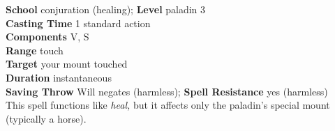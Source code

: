 \textbf{School} conjuration (healing); \textbf{Level} paladin 3\\
\textbf{Casting Time} 1 standard action\\
\textbf{Components} V, S\\
\textbf{Range} touch\\
\textbf{Target} your mount touched\\
\textbf{Duration} instantaneous\\
\textbf{Saving Throw }Will negates (harmless); \textbf{Spell Resistance} yes (harmless)\\
This spell functions like \textit{heal, }but it affects only the paladin's special mount (typically a horse).\\
